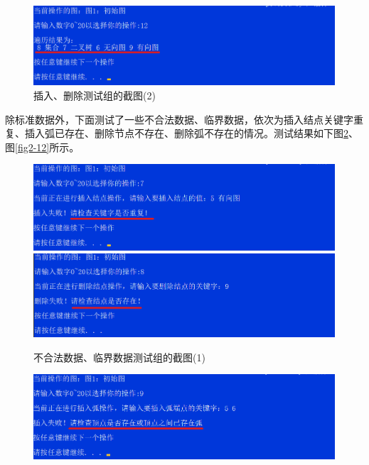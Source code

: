 \documentclass[supercite]{Experimental_Report}
\theoremstyle{definition}
\begin{document}
\begin{enumerate}
\begin{figure}[htb]
\begin{center}
			\includegraphics[scale=0.6]{./images/图/2-12.png}
			\caption{插入、删除测试组的截图(2)}
			\label{fig2-10}
		\end{center}
	\end{figure}
	
	\newpage

	除标准数据外，下面测试了一些不合法数据、临界数据，依次为插入结点关键字重复、插入弧已存在、删除节点不存在、删除弧不存在的情况。测试结果如下图\ref{fig2-11}、图\ref{fig2-12}所示。
	\begin{figure}[htb] %
		\begin{center}
			\includegraphics[scale=0.6]{./images/图/2-2-7.png}
			\includegraphics[scale=0.6]{./images/图/2-2-8.png}
			\caption{不合法数据、临界数据测试组的截图(1)}
			\label{fig2-11}
		\end{center}
	\end{figure}
	\begin{figure}[htb] %
		\begin{center}
			\includegraphics[scale=0.6]{./images/图/2-2-9.png}

\end{center}
\end{figure}
\end{enumerate}
\end{document}
